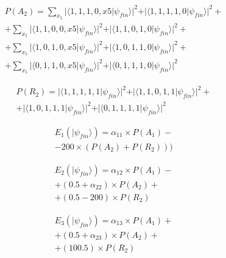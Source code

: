 \documentclass[10pt,twocolumn]{llncs}
\begin{document}
\begin{equation}
\begin{split}
P(A_{2}) = \sum_{x_{5}}\vert\langle1,1,1,0,x{5}\vert\psi_{fin}\rangle\vert^{2} + \vert\langle1,1,1,1,0\vert\psi_{fin}\rangle\vert^{2} + \\ + \sum_{x_{5}}\vert\langle1,1,0,0,x{5}\vert\psi_{fin}\rangle\vert^{2}+ \vert\langle1,1,0,1,0\vert\psi_{fin}\rangle\vert^{2} + \\ 
+ \sum_{x_{5}}\vert\langle1,0,1,0,x{5}\vert\psi_{fin}\rangle\vert^{2} + \vert\langle1,0,1,1,0\vert\psi_{fin}\rangle\vert^{2}
+ \\ + \sum_{x_{5}}\vert\langle0,1,1,0,x{5}\vert\psi_{fin}\rangle\vert^{2} + \vert\langle0,1,1,1,0\vert\psi_{fin}\rangle\vert^{2}
\end{split}
\end{equation}

\begin{equation}
\begin{split}
P(R_{2}) = \vert\langle1,1,1,1,1\vert\psi_{fin}\rangle\vert^{2} + \vert\langle1,1,0,1,1\vert\psi_{fin}\rangle\vert^{2} + \\ 
+ \vert\langle1,0,1,1,1\vert\psi_{fin}\rangle\vert^{2}
+ \vert\langle0,1,1,1,1\vert\psi_{fin}\rangle\vert^{2}
 \end{split}
\end{equation}


   

 
\begin{equation}
\begin{split}
E_{1}(\vert\psi_{fin}\rangle)=\alpha_{11}\times P(A_{1}) - \\ 
 - 200\times( P(A_{2})  +  P(R_{2}) ) 
 ) 
\end{split}
\label{eq:pirates_payoff32:1}
\end{equation}

\begin{equation}
\begin{split}
E_{2}(\vert\psi_{fin}\rangle)=\alpha_{12}\times P(A_{1}) - \\
 + (0.5 + \alpha_{22})\times P(A_{2})  + \\ 
+(0.5-200)\times P(R_{2})
\end{split}
\label{eq:pirates_payoff32:2}
\end{equation}

\begin{equation}
\begin{split}
E_{3}(\vert\psi_{fin}\rangle)=\alpha_{13}\times P(A_{1}) + \\
 + (0.5 + \alpha_{23})\times P(A_{2})   + \\
 + (100.5)\times P(R_{2}) 
\end{split}
\label{eq:pirates_payoff32:3}
\end{equation}
\end{document}
